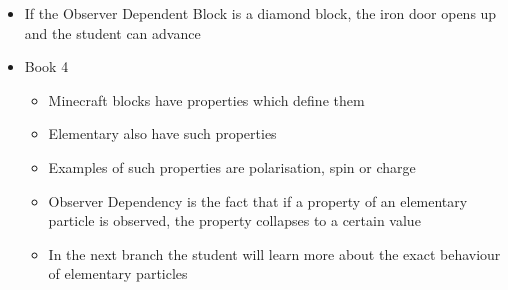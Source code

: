 \documentclass[11pt,twoside]{report} %
\begin{document}
\begin{itemize}
	\item If the Observer Dependent Block is a diamond block, the iron door opens up and the student can advance
	\item Book 4
	\begin{itemize}
		\item Minecraft blocks have properties which define them
		\item Elementary also have such properties
		\item Examples of such properties are polarisation, spin or charge
		\item Observer Dependency is the fact that if a property of an elementary particle is observed, the property collapses to a certain value
		\item In the next branch the student will learn more about the exact behaviour of elementary particles
	\end{itemize}
\end{itemize}
\end{document}
